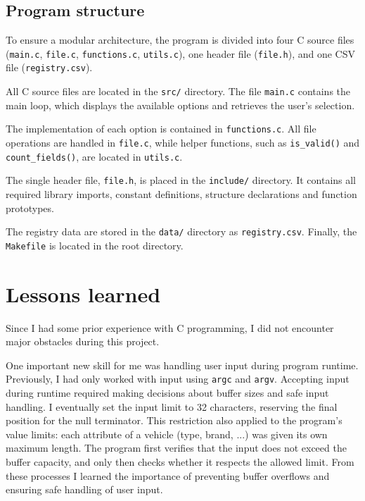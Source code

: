 \documentclass[12pt, a4paper]{article}
\begin{document}
\subsection{Program structure}

To ensure a modular architecture, the program is divided into four C source files (\texttt{main.c}, \texttt{file.c}, \texttt{functions.c}, \texttt{utils.c}), one header file (\texttt{file.h}), and one CSV file (\texttt{registry.csv}).

All C source files are located in the \texttt{src/} directory. The file \texttt{main.c} contains the main loop, which displays the available options and retrieves the user’s selection. 

The implementation of each option is contained in \texttt{functions.c}. All file operations are handled in \texttt{file.c}, while helper functions, such as \texttt{is\_valid()} and \texttt{count\_fields()}, are located in \texttt{utils.c}.

The single header file, \texttt{file.h}, is placed in the \texttt{include/} directory. It contains all required library imports, constant definitions, structure declarations and function prototypes.

The registry data are stored in the \texttt{data/} directory as \texttt{registry.csv}. Finally, the \texttt{Makefile} is located in the root directory.

\section{Lessons learned}

Since I had some prior experience with C programming, I did not encounter major obstacles during this project.

One important new skill for me was handling user input during program runtime. Previously, I had only worked with input using \texttt{argc} and \texttt{argv}. Accepting input during runtime required making decisions about buffer sizes and safe input handling. I eventually set the input limit to 32 characters, reserving the final position for the null terminator. This restriction also applied to the program’s value limits: each attribute of a vehicle (type, brand, ...) was given its own maximum length. The program first verifies that the input does not exceed the buffer capacity, and only then checks whether it respects the allowed limit. From these processes I learned the importance of preventing buffer overflows and ensuring safe handling of user input.
\end{document}
